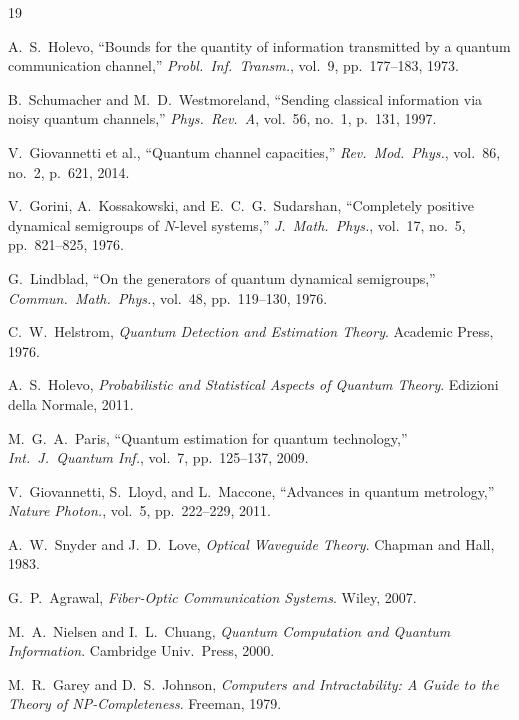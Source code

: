 \documentclass[journal,twocolumn]{IEEEtran}
\theoremstyle{definition}
\theoremstyle{plain}
\begin{document}
\begin{thebibliography}{19}


A.~S.~Holevo, ``Bounds for the quantity of information transmitted by
a quantum communication channel,'' \emph{Probl.\ Inf.\ Transm.},
vol.~9, pp.~177--183, 1973.

B.~Schumacher and M.~D.~Westmoreland, ``Sending classical information
via noisy quantum channels,'' \emph{Phys.\ Rev.\ A}, vol.~56, no.~1,
p.~131, 1997.

V.~Giovannetti et al., ``Quantum channel capacities,''
\emph{Rev.\ Mod.\ Phys.}, vol.~86, no.~2, p.~621, 2014.

V.~Gorini, A.~Kossakowski, and E.~C.~G.~Sudarshan, ``Completely
positive dynamical semigroups of $N$-level systems,''
\emph{J.\ Math.\ Phys.}, vol.~17, no.~5, pp.~821--825, 1976.

G.~Lindblad, ``On the generators of quantum dynamical semigroups,''
\emph{Commun.\ Math.\ Phys.}, vol.~48, pp.~119--130, 1976.

C.~W.~Helstrom, \emph{Quantum Detection and Estimation Theory}.
Academic Press, 1976.

A.~S.~Holevo, \emph{Probabilistic and Statistical Aspects of Quantum
Theory}. Edizioni della Normale, 2011.

M.~G.~A.~Paris, ``Quantum estimation for quantum technology,''
\emph{Int.\ J.\ Quantum Inf.}, vol.~7, pp.~125--137, 2009.

V.~Giovannetti, S.~Lloyd, and L.~Maccone, ``Advances in quantum
metrology,'' \emph{Nature Photon.}, vol.~5, pp.~222--229, 2011.

A.~W.~Snyder and J.~D.~Love, \emph{Optical Waveguide Theory}.
Chapman and Hall, 1983.

G.~P.~Agrawal, \emph{Fiber-Optic Communication Systems}. Wiley, 2007.

M.~A.~Nielsen and I.~L.~Chuang, \emph{Quantum Computation and Quantum
Information}. Cambridge Univ.\ Press, 2000.

M.~R.~Garey and D.~S.~Johnson, \emph{Computers and Intractability: A
Guide to the Theory of NP-Completeness}. Freeman, 1979.


\end{thebibliography}
\end{document}
